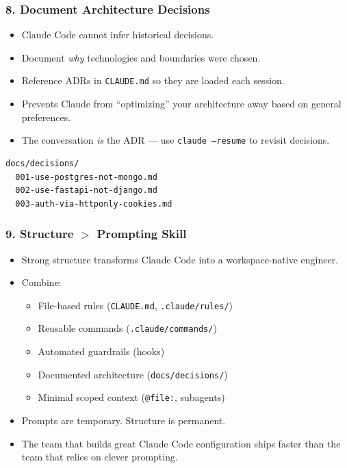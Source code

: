 \begin{frame}[fragile]\frametitle{8. Document Architecture Decisions}
  \begin{itemize}
    \item Claude Code cannot infer historical decisions.
    \item Document \textit{why} technologies and boundaries were chosen.
    \item Reference ADRs in \texttt{CLAUDE.md} so they are loaded each session.
    \item Prevents Claude from ``optimizing'' your architecture away based on general preferences.
    \item The conversation \textit{is} the ADR --- use \texttt{claude --resume} to revisit decisions.
  \end{itemize}
\begin{lstlisting}
docs/decisions/
  001-use-postgres-not-mongo.md
  002-use-fastapi-not-django.md
  003-auth-via-httponly-cookies.md
\end{lstlisting}


\end{frame}

\begin{frame}[fragile]\frametitle{9. Structure $>$ Prompting Skill}
  \begin{itemize}
    \item Strong structure transforms Claude Code into a workspace-native engineer.
    \item Combine:
    \begin{itemize}
        \item File-based rules (\texttt{CLAUDE.md}, \texttt{.claude/rules/})
        \item Reusable commands (\texttt{.claude/commands/})
        \item Automated guardrails (hooks)
        \item Documented architecture (\texttt{docs/decisions/})
        \item Minimal scoped context (\texttt{@file:}, subagents)
    \end{itemize}
    \item Prompts are temporary. Structure is permanent.
    \item The team that builds great Claude Code configuration ships faster than the team that relies on clever prompting.
  \end{itemize}
\end{frame}

